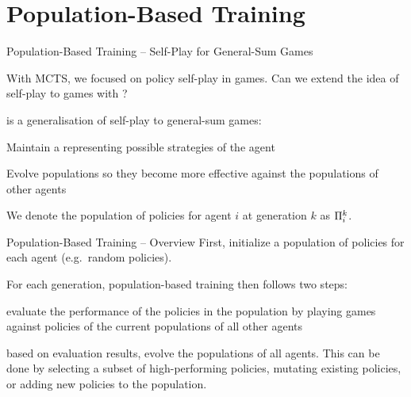 \section{Population-Based Training}

\begin{frame}[t]{Population-Based Training -- Self-Play for General-Sum Games}
    \begin{problembox}
        With MCTS, we focused on policy self-play in  games. Can we extend the idea of self-play to  games with ?
    \end{problembox}

    \pause
    \vspace{1em}

     is a generalisation of self-play to general-sum games:
    \blist
        \item Maintain a  representing possible strategies of the agent
        \item Evolve populations so they become more effective against the populations of other agents
        \item We denote the population of policies for agent $i$ at generation $k$ as $\Pi_i^k$.
    \elist
\end{frame}

\begin{frame}{Population-Based Training -- Overview}
    First, initialize a population of policies for each agent (e.g.\ random policies).
    
    \vspace{10pt}

    For each generation, population-based training then follows two steps:
    \blist
        \item<2->  evaluate the performance of the policies in the population by playing games against policies of the current populations of all other agents
        
        \item<3->  based on evaluation results, evolve the populations of all agents. This can be done by selecting a subset of high-performing policies, mutating existing policies, or adding new policies to the population.
    \elist
    
\end{frame}

